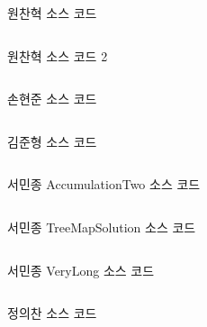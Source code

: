 \begin{frame}{원찬혁 소스 코드}
\inputminted{java}{../src/\prob/chanhyeok/Main.java}
\end{frame}

\begin{frame}{원찬혁 소스 코드 2}
\inputminted{java}{../src/\prob/chanhyeok/Main2.java}
\end{frame}

\begin{frame}{손현준 소스 코드}
\inputminted{java}{../src/\prob/hyunjoon/P1999.java}
\end{frame}

\begin{frame}{김준형 소스 코드}
\inputminted{java}{../src/\prob/joonhyeong/Main.java}
\end{frame}

\begin{frame}{서민종 AccumulationTwo 소스 코드}
\inputminted{java}{../src/\prob/minjong/AccumulationTwo.java}
\end{frame}

\begin{frame}{서민종 TreeMapSolution 소스 코드}
\inputminted{java}{../src/\prob/minjong/TreeMapSolution.java}
\end{frame}

\begin{frame}{서민종 VeryLong 소스 코드}
\inputminted{java}{../src/\prob/minjong/VeryLong.java}
\end{frame}

\begin{frame}{정의찬 소스 코드}
\inputminted{java}{../src/\prob/uichan/1999.java}
\end{frame}
